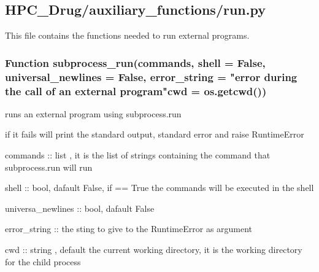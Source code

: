 

\subsection{HPC\_Drug/auxiliary\_functions/run.py}

    This file contains the functions needed to run external programs.

    \subsubsection{Function subprocess\_run(commands, shell = False, universal\_newlines = False, error\_string = "error during the call of an external program"cwd = os.getcwd())}
    	
    	runs an external program using subprocess.run
    	
    	if it fails will print the standard output, standard error
    	and raise RuntimeError
    	
    	commands :: list , it is the list of strings containing the command that
    	subprocess.run will run
    	
    	shell :: bool, dafault False, if == True the commands will be executed in the shell
    	
    	universa\_newlines :: bool, dafault False
    	
    	error\_string :: the sting to give to the RuntimeError as argument
    	
    	cwd :: string , default the current working directory, it is the working directory for the child process